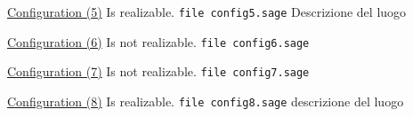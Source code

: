 \documentclass{amsart}
\theoremstyle{plain}
\theoremstyle{definition}
\begin{document}
\underline{Configuration (5)} Is realizable.
\verb+file config5.sage+
Descrizione del luogo


\underline{Configuration (6)} Is not realizable.
\verb+file config6.sage+



\underline{Configuration (7)} Is not realizable.
\verb+file config7.sage+



\underline{Configuration (8)} Is realizable.
\verb+file config8.sage+
descrizione del luogo




\end{document}

